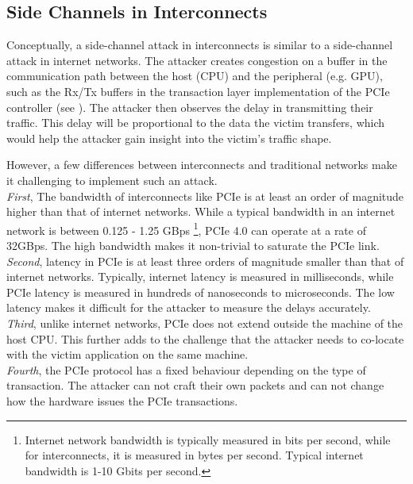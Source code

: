 \subsection{Side Channels in Interconnects}
\label{subsec:interconnect-sc-background-side-channels}

Conceptually, a side-channel attack in interconnects is similar to a side-channel attack in internet networks. 
The attacker creates congestion on a buffer in the communication path between the host (CPU) and the peripheral (e.g. GPU), such as the Rx/Tx buffers in the transaction layer implementation of the PCIe controller (see ).
The attacker then observes the delay in transmitting their traffic.
This delay will be proportional to the data the victim transfers, which would help the attacker gain insight into the victim's traffic shape.

However, a few differences between interconnects and traditional networks make it challenging to implement such an attack. \\
\textit{First}, The bandwidth of interconnects like PCIe is at least an order of magnitude higher than that of internet networks.
While a typical bandwidth in an internet network is between 0.125 - 1.25 GBps 
\footnote{Internet network bandwidth is typically measured in bits per second, while for interconnects, it is measured in bytes per second. Typical internet bandwidth is 1-10 Gbits per second.},
PCIe 4.0 can operate at a rate of 32GBps.
The high bandwidth makes it non-trivial to saturate the PCIe link. \\
\textit{Second}, latency in PCIe is at least three orders of magnitude smaller than that of internet networks.
Typically, internet latency is measured in milliseconds, while PCIe latency is measured in hundreds of nanoseconds to microseconds.
The low latency makes it difficult for the attacker to measure the delays accurately. \\
\textit{Third}, unlike internet networks, PCIe does not extend outside the machine of the host CPU.
This further adds to the challenge that the attacker needs to co-locate with the victim application on the same machine. \\
\textit{Fourth}, the PCIe protocol has a fixed behaviour depending on the type of transaction.
The attacker can not craft their own packets and can not change how the hardware issues the PCIe transactions.


